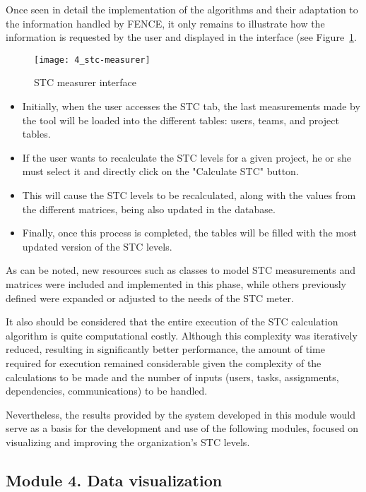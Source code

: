Once seen in detail the implementation of the algorithms and their adaptation to the information handled by FENCE, it only remains to illustrate how the information is requested by the user and displayed in the interface (see Figure~\ref{fig:stc-measurer}.

\begin{figure}
	\centering
	\texttt{[image: 4\_stc-measurer]}
	\caption[STC measurer interface]{STC measurer interface}
	\label{fig:stc-measurer}
\end{figure}

\begin{itemize}
\item Initially, when the user accesses the STC tab, the last measurements made by the tool will be loaded into the different tables: users, teams, and project tables. 
\item If the user wants to recalculate the STC levels for a given project, he or she must select it and directly click on the "Calculate STC" button. 
\item This will cause the STC levels to be recalculated, along with the values from the different matrices, being also updated in the database. 
\item Finally, once this process is completed, the tables will be filled with the most updated version of the STC levels.
\end{itemize}

As can be noted, new resources such as classes to model STC measurements and matrices were included and implemented in this phase, while others previously defined were expanded or adjusted to the needs of the STC meter.

It also should be considered that the entire execution of the STC calculation algorithm is quite computational costly. Although this complexity was iteratively reduced, resulting in significantly better performance, the amount of time required for execution remained considerable given the complexity of the calculations to be made and the number of inputs (users, tasks, assignments, dependencies, communications) to be handled.

Nevertheless, the results provided by the system developed in this module would serve as a basis for the development and use of the following modules, focused on visualizing and improving the organization's STC levels.

\subsection{Module 4. Data visualization}


